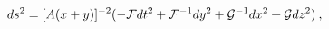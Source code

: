 \begin{equation}
 d s^2 = [A(x+y)]^{-2} (-{\cal F}dt^2+
 {\cal F}^{-1}dy^2+{\cal G}^{-1}dx^2+
 {\cal G}dz^2)\:,
 \label{C-metric}
 \end{equation}

